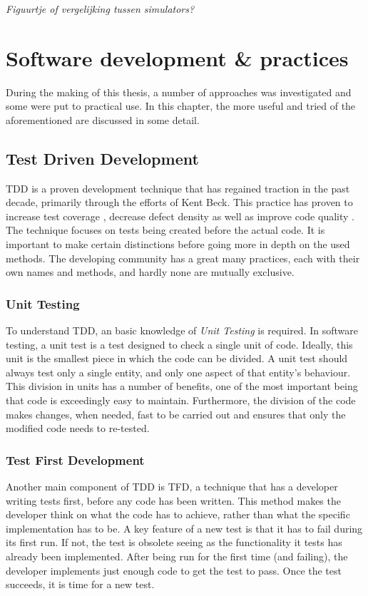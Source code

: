 \documentclass[11pt,british]{article}
\begin{document}
\emph{\color{red}Figuurtje of vergelijking tussen simulators?}


\section{Software development \& practices}
During the making of this thesis, a number of approaches was investigated and some were put to practical use. In this chapter, the more useful and tried of the aforementioned are discussed in some detail.


\subsection{Test Driven Development}
\gls{TDD} is a proven development technique that has regained traction in the past decade, primarily through the efforts of Kent Beck\cite{VHDLUnit}. This practice has proven to increase test coverage \cite{Siniaalto:2007:CCS:1302496.1302946}, decrease defect density \cite{TDDinpractice} as well as improve code quality \cite{TDDinpractice,conf/isese/BhatN06}. The technique focuses on tests being created before the actual code. It is important to make certain distinctions before going more in depth on the used methods. The developing community has a great many practices, each with their own names and methods, and hardly none are mutually exclusive.

\subsubsection{Unit Testing}
To understand \gls{TDD}, an basic knowledge of \emph{Unit Testing} is required. In software testing, a unit test is a test designed to check a single unit of code. Ideally, this unit is the smallest piece in which the code can be divided. A unit test should always test only a single entity, and only one aspect of that entity's behaviour. This division in units has a number of benefits, one of the most important being that code is exceedingly easy to maintain. Furthermore, the division of the code makes changes, when needed, fast to be carried out and ensures that only the modified code needs to re-tested.

\subsubsection{Test First Development}
Another main component of \gls{TDD} is \gls{TFD}, a technique that has a developer writing tests first, before any code has been written. This method makes the developer think on what the code has to achieve, rather than what the specific implementation has to be. A key feature of a new test is that it has to fail during its first run. If not, the test is obsolete seeing as the functionality it tests has already been implemented. After being run for the first time (and failing), the developer implements just enough code to get the test to pass. Once the test succeeds, it is time for a new test.
\end{document}
